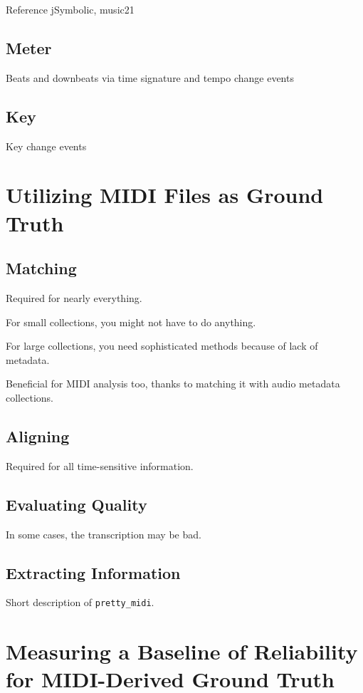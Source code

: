 \documentclass{article}
\begin{document}
Reference jSymbolic, music21

\subsection{Meter}

Beats and downbeats via time signature and tempo change events

\subsection{Key}

Key change events

\section{Utilizing MIDI Files as Ground Truth}

\subsection{Matching}

Required for nearly everything.

For small collections, you might not have to do anything.

For large collections, you need sophisticated methods because of lack of metadata.

Beneficial for MIDI analysis too, thanks to matching it with audio metadata collections.

\subsection{Aligning}

Required for all time-sensitive information.

\subsection{Evaluating Quality}

In some cases, the transcription may be bad.

\subsection{Extracting Information}

Short description of \texttt{pretty\_midi}.

\section{Measuring a Baseline of Reliability for MIDI-Derived Ground Truth}
\end{document}
